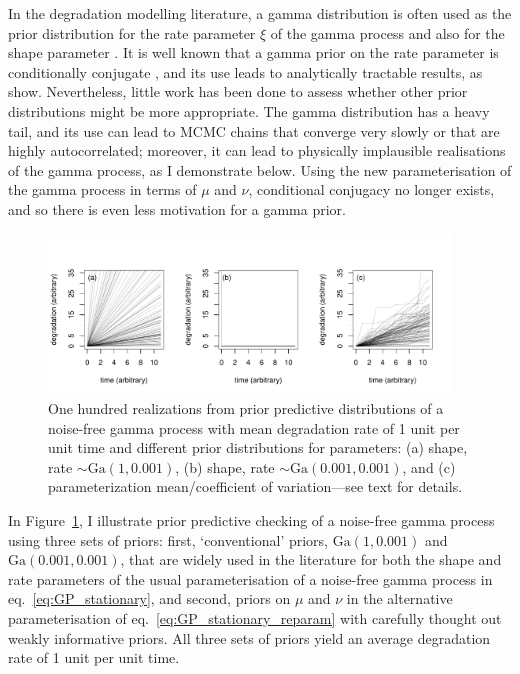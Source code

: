 In the degradation modelling literature, a gamma distribution is often used as the prior distribution for the rate parameter $\xi$ of the gamma process \citep{lawless2004} and also for the shape parameter \citep{rodriguez-picon2018}. It is well known that a gamma prior on the rate parameter is conditionally conjugate \citep{pradhan2011}, and its use leads to analytically tractable results, as \cite{lawless2004} show. Nevertheless, little work has been done to assess whether other prior distributions might be more appropriate. The gamma distribution has a heavy tail, and its use can lead to MCMC chains that converge very slowly or that are highly autocorrelated; moreover, it can lead to physically implausible realisations of the gamma process, as I demonstrate below. Using the new parameterisation of the gamma process in terms of $\mu$ and $\nu$, conditional conjugacy no longer exists, and so there is even less motivation for a gamma prior.

\begin{figure}[tbp]
  \centering
  \includegraphics[width=0.95\textwidth]{./figures/ch-4/PPCs.pdf}
  \caption{One hundred realizations from prior predictive distributions of a noise-free gamma process with mean degradation rate of 1 unit per unit time and different prior distributions for parameters: (a) shape, rate $\sim \mbox{Ga}(1, 0.001)$, (b) shape, rate $\sim \mbox{Ga}(0.001, 0.001)$, and (c) parameterization mean/coefficient of variation---see text for details.}
  \label{fig:ppc}
\end{figure}

In Figure~\ref{fig:ppc}, I illustrate prior predictive checking of a noise-free gamma process using three sets of priors: first, `conventional' priors, $\mbox{Ga}(1, 0.001)$ and $\mbox{Ga}(0.001, 0.001)$, that are widely used in the literature for both the shape and rate parameters of the usual parameterisation of a noise-free gamma process in eq.~\eqref{eq:GP_stationary}, and second, priors on $\mu$ and $\nu$ in the alternative parameterisation of eq.~\eqref{eq:GP_stationary_reparam} with carefully thought out weakly informative priors. All three sets of priors yield an average degradation rate of 1 unit per unit time. 

